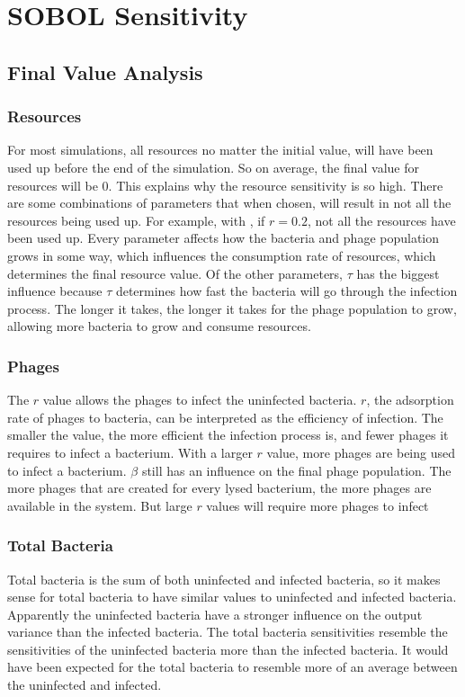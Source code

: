 \section{SOBOL Sensitivity}
\subsection{Final Value Analysis}
\subsubsection{Resources}
For most simulations, all resources no matter the initial value, will have been used up before the end of the simulation. 
So on average, the final value for resources will be 0. 
This explains why the resource sensitivity is so high. 
There are some combinations of parameters that when chosen, will result in not all the resources being used up. 
For example, with , if $r=0.2$, not all the resources have been used up. 
Every parameter affects how the bacteria and phage population grows in some way, which influences the consumption rate of resources, which determines the final resource value. 
Of the other parameters, $\tau$ has the biggest influence because $\tau$ determines how fast the bacteria will go through the infection process. 
The longer it takes, the longer it takes for the phage population to grow, allowing more bacteria to grow and consume resources. 

\subsubsection{Phages}
The $r$ value allows the phages to infect the uninfected bacteria. 
$r$, the adsorption rate of phages to bacteria, can be interpreted as the efficiency of infection. 
The smaller the value, the more efficient the infection process is, and fewer phages it requires to infect a bacterium. 
With a larger $r$ value, more phages are being used to infect a bacterium. 
$\beta$ still has an influence on the final phage population. 
The more phages that are created for every lysed bacterium, the more phages are available in the system. 
But large $r$ values will require more phages to infect 

\subsubsection{Total Bacteria}
Total bacteria is the sum of both uninfected and infected bacteria, so it makes sense for total bacteria to have similar values to uninfected and infected bacteria. 
Apparently the uninfected bacteria have a stronger influence on the output variance than the infected bacteria. 
The total bacteria sensitivities resemble the sensitivities of the uninfected bacteria more than the infected bacteria. 
It would have been expected for the total bacteria to resemble more of an average between the uninfected and infected. 

